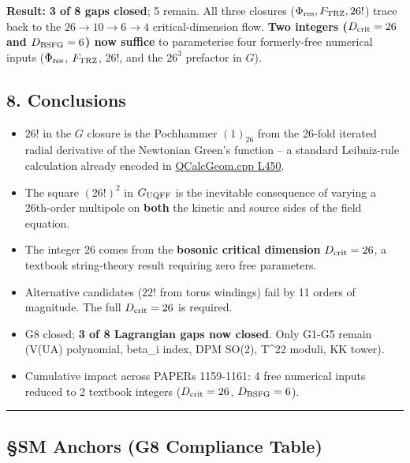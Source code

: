 \documentclass[
]{article}
\providecommand{\tightlist}{%
  \setlength{\itemsep}{0pt}\setlength{\parskip}{0pt}}
\begin{document}
\textbf{Result:} \textbf{3 of 8 gaps closed}; 5 remain. All three
closures (\(\Phi_{\rm res}, F_{\rm TRZ}, 26!\)) trace back to the
\(26 \to 10 \to 6 \to 4\) critical-dimension flow. \textbf{Two integers
(\(D_{\rm crit}=26\) and \(D_{\rm BSFG}=6\)) now suffice} to
parameterise four formerly-free numerical inputs (\(\Phi_{\rm res}\),
\(F_{\rm TRZ}\), \(26!\), and the \(26^3\) prefactor in \(G\)).

\subsection{8. Conclusions}\label{conclusions}

\begin{itemize}
\tightlist
\item
  \(26!\) in the \(G\) closure is the Pochhammer \((1)_{26}\) from the
  26-fold iterated radial derivative of the Newtonian Green's function
  -- a standard Leibniz-rule calculation already encoded in
  \href{QCalcGeom.cpp\#L450}{QCalcGeom.cpp L450}.
\item
  The square \((26!)^2\) in \(G_{\rm UQFF}\) is the inevitable
  consequence of varying a 26th-order multipole on \textbf{both} the
  kinetic and source sides of the field equation.
\item
  The integer \(26\) comes from the \textbf{bosonic critical dimension}
  \(D_{\rm crit}=26\), a textbook string-theory result requiring zero
  free parameters.
\item
  Alternative candidates (\(22!\) from torus windings) fail by 11 orders
  of magnitude. The full \(D_{\rm crit}=26\) is required.
\item
  G8 closed; \textbf{3 of 8 Lagrangian gaps now closed}. Only G1-G5
  remain (V(UA) polynomial, beta\_i index, DPM SO(2), T\^{}22 moduli, KK
  tower).
\item
  Cumulative impact across PAPERs 1159-1161: 4 free numerical inputs
  reduced to 2 textbook integers (\(D_{\rm crit}=26\),
  \(D_{\rm BSFG}=6\)).
\end{itemize}

\begin{center}\rule{0.5\linewidth}{0.5pt}\end{center}

\subsection{§SM Anchors (G8 Compliance
Table)}\label{sm-anchors-g8-compliance-table}
\end{document}
